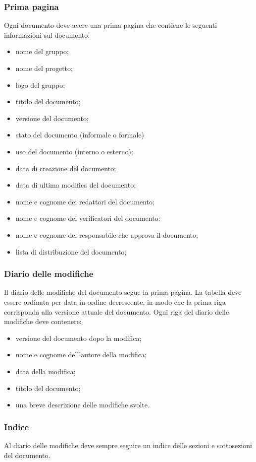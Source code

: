\documentclass[12pt,a4paper]{article}
\begin{document}
\subsubsection{Prima pagina}
Ogni documento deve avere una prima pagina che contiene le seguenti informazioni sul documento:
\begin{itemize}
	\item nome del gruppo;
	\item nome del progetto;
	\item logo del gruppo;
	\item titolo del documento;
	\item versione del documento;
	\item stato del documento (informale o formale)
	\item uso del documento (interno o esterno);
	\item data di creazione del documento;
	\item data di ultima modifica del documento;
	\item nome e cognome dei redattori del documento;
	\item nome e cognome dei verificatori del documento;
	\item nome e cognome del responsabile che approva il documento;
	\item lista di distribuzione del documento;     
\end{itemize}

\subsubsection{Diario delle modifiche}
Il diario delle modifiche del documento segue la prima pagina. La tabella deve essere ordinata per data in ordine decrescente, in modo che la prima riga corrisponda alla versione attuale del documento. Ogni riga del diario delle modifiche deve contenere:
\begin{itemize}
	\item versione del documento dopo la modifica;
	\item nome e cognome dell'autore della modifica;
	\item data della modifica;
	\item titolo del documento;
	\item una breve descrizione delle modifiche svolte.
\end{itemize}

\subsubsection{Indice}
Al diario delle modifiche deve sempre seguire un indice delle sezioni e sottosezioni del documento.
\end{document}
